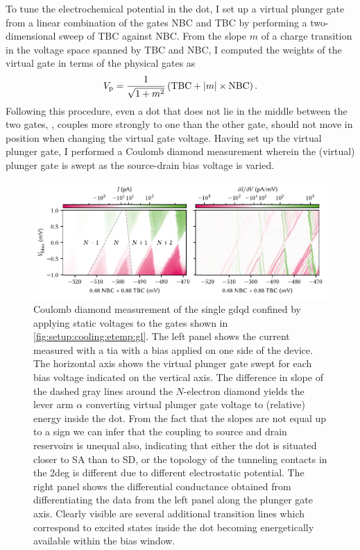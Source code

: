 To tune the electrochemical potential in the dot, I set up a virtual plunger gate~\cite{Botzem2018} from a linear combination of the gates NBC and TBC by performing a two-dimensional sweep of TBC against NBC\@.
From the slope $m$ of a charge transition in the voltage space spanned by TBC and NBC, I computed the weights of the virtual gate in terms of the physical gates as
\begin{equation}
    V_{\mathrm{p}} = \frac{1}{\sqrt{1 + m^2}}\left(\mathrm{TBC} + \abs{m}\times \mathrm{NBC}\right).
\end{equation}
Following this procedure, even a dot that does not lie in the middle between the two gates, \ie, couples more strongly to one than the other gate, should not move in position when changing the virtual gate voltage.
Having set up the virtual plunger gate, I performed a Coulomb diamond measurement wherein the (virtual) plunger gate is swept as the source-drain bias voltage is varied.

\begin{figure}
    \centering
    \includegraphics{img/pdf/setup/diamonds}
    \caption[]{
        Coulomb diamond measurement of the single \gls{gdqd} confined by applying static voltages to the gates shown in \cref{fig:setup:cooling:etemp:gl}.
        The left panel shows the current measured with a \gls{tia} with a bias applied on one side of the device.
        The horizontal axis shows the virtual plunger gate swept for each bias voltage indicated on the vertical axis.
        The difference in slope of the dashed gray lines around the $N$-electron diamond yields the lever arm $\alpha$ converting virtual plunger gate voltage to (relative) energy inside the dot.
        From the fact that the slopes are not equal up to a sign we can infer that the coupling to source and drain reservoirs is unequal also, indicating that either the dot is situated closer to SA than to SD, or the topology of the tunneling contacts in the \gls{2deg} is different due to different electrostatic potential.
        The right panel shows the differential conductance obtained from differentiating the data from the left panel along the plunger gate axis.
        Clearly visible are several additional transition lines which correspond to excited states inside the dot becoming energetically available within the bias window.
    }
    \label{fig:setup:cooling:etemp:diamonds}
\end{figure}

